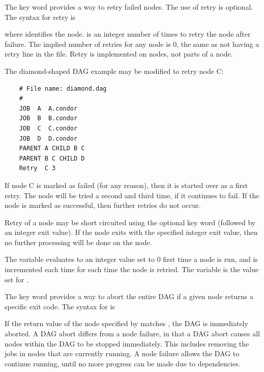 
The  key word provides a
way to retry failed nodes.
The use of retry is optional.
The syntax for retry is

   

where  identifies the node.
 is an integer
number of times to retry the node after failure.
The implied number of retries for any node is 0,
the same as not having a retry line in the file. 
Retry is implemented on nodes, not parts of a node.

The diamond-shaped DAG example may be modified to
retry node C:

\footnotesize
\begin{verbatim}
    # File name: diamond.dag
    #
    JOB  A  A.condor 
    JOB  B  B.condor 
    JOB  C  C.condor	
    JOB  D  D.condor
    PARENT A CHILD B C
    PARENT B C CHILD D
    Retry  C 3
\end{verbatim}
\normalsize

If node C is marked as failed (for any reason),
then it is started over as a first retry.
The node will be tried a second and third time,
if it continues to fail.
If the node is marked as successful, then further retries do not occur.

Retry of a node may be short circuited using the
optional key word  (followed by an
integer exit value).
If the node exits with the specified integer exit value,
then no further processing will be done
on the node. 

The variable  evaluates to an 
integer value set to 0 first time a node is run,
and is incremented each time for each time the node is retried. 
The variable  is the value set for
.


The  key word provides a way
to abort the entire DAG if a given node returns a specific exit
code.  The syntax for  is

  

If the return value of the node specified by 
matches ,
the DAG is immediately aborted.
A DAG abort differs from a node failure,
in that a DAG abort causes all nodes within the DAG to be stopped immediately.
This includes removing the jobs in nodes that are currently running.
A node failure allows the DAG to continue running,
until no more progress can be made due to dependencies.

